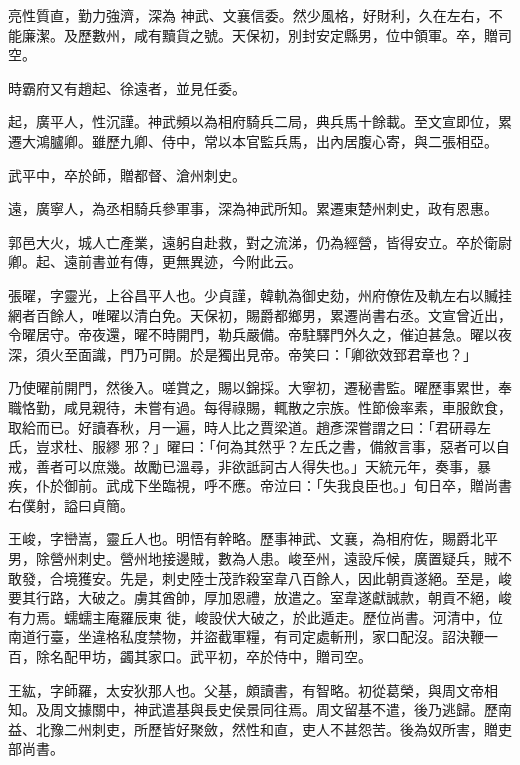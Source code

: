 \begin{pinyinscope}
 亮性質直，勤力強濟，深為
 神武、文襄信委。然少風格，好財利，久在左右，不能廉潔。及歷數州，咸有黷貨之號。天保初，別封安定縣男，位中領軍。卒，贈司空。



 時霸府又有趙起、徐遠者，並見任委。



 起，廣平人，性沉謹。神武頻以為相府騎兵二局，典兵馬十餘載。至文宣即位，累遷大鴻臚卿。雖歷九卿、侍中，常以本官監兵馬，出內居腹心寄，與二張相亞。



 武平中，卒於師，贈都督、滄州刺史。



 遠，廣寧人，為丞相騎兵參軍事，深為神武所知。累遷東楚州刺史，政有恩惠。



 郭邑大火，城人亡產業，遠躬自赴救，對之流涕，仍為經營，皆得安立。卒於衛尉卿。起、遠前書並有傳，更無異迹，今附此云。



 張曜，字靈光，上谷昌平人也。少貞謹，韓軌為御史劾，州府僚佐及軌左右以贓挂網者百餘人，唯曜以清白免。天保初，賜爵都鄉男，累遷尚書右丞。文宣曾近出，令曜居守。帝夜還，曜不時開門，勒兵嚴備。帝駐驛門外久之，催迫甚急。曜以夜深，須火至面識，門乃可開。於是獨出見帝。帝笑曰：「卿欲效郅君章也？」



 乃使曜前開門，然後入。嗟賞之，賜以錦採。大寧初，遷秘書監。曜歷事累世，奉職恪勤，咸見親待，未嘗有過。每得祿賜，輒散之宗族。性節儉率素，車服飲食，取給而已。好讀春秋，月一遍，時人比之賈梁道。趙彥深嘗謂之曰：「君研尋左氏，豈求杜、服繆
 邪？」曜曰：「何為其然乎？左氏之書，備敘言事，惡者可以自戒，善者可以庶幾。故勵已溫尋，非欲詆訶古人得失也。」天統元年，奏事，暴疾，仆於御前。武成下坐臨視，呼不應。帝泣曰：「失我良臣也。」旬日卒，贈尚書右僕射，謚曰貞簡。



 王峻，字巒嵩，靈丘人也。明悟有幹略。歷事神武、文襄，為相府佐，賜爵北平男，除營州刺史。營州地接邊賊，數為人患。峻至州，遠設斥候，廣置疑兵，賊不敢發，合境獲安。先是，刺史陸士茂詐殺室韋八百餘人，因此朝貢遂絕。至是，峻要其行路，大破之。虜其酋帥，厚加恩禮，放遣之。室韋遂獻誠款，朝貢不絕，峻有力焉。蠕蠕主庵羅辰東
 徙，峻設伏大破之，於此遁走。歷位尚書。河清中，位南道行臺，坐違格私度禁物，并盜截軍糧，有司定處斬刑，家口配沒。詔決鞭一百，除名配甲坊，蠲其家口。武平初，卒於侍中，贈司空。



 王紘，字師羅，太安狄那人也。父基，頗讀書，有智略。初從葛榮，與周文帝相知。及周文據關中，神武遣基與長史侯景同往焉。周文留基不遣，後乃逃歸。歷南益、北豫二州刺吏，所歷皆好聚斂，然性和直，吏人不甚怨苦。後為奴所害，贈吏部尚書。




\end{pinyinscope}
